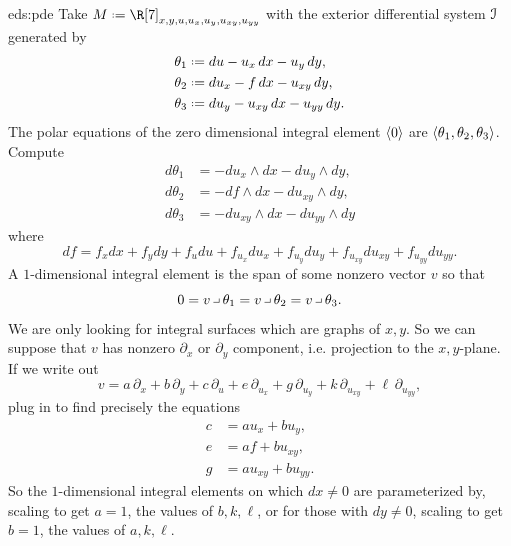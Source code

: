\begin{answer}{eds:pde}
Take \(M\defeq\R[7]_{x,y,u,u_x,u_y,u_{xy},u_{yy}}\) with the exterior differential system \(\mathcal{I}\) generated by
\begin{align*}
\theta_1&\defeq du-u_x\,dx-u_y\,dy,\\
\theta_2&\defeq du_x-f\,dx-u_{xy}\,dy,\\
\theta_3&\defeq du_y-u_{xy}\,dx-u_{yy}\,dy.
\end{align*}
The polar equations of the zero dimensional integral element \(\left<0\right>\) are \(\left<\theta_1,\theta_2,\theta_3\right>\).
Compute
\begin{align*}
d\theta_1&=-du_x\wedge dx-du_y\wedge dy,\\
d\theta_2&=-df\wedge dx-du_{xy}\wedge dy,\\
d\theta_3&=-du_{xy}\wedge dx-du_{yy}\wedge dy
\end{align*}
where
\[
df=f_x dx + f_y dy+f_u du+f_{u_x}du_x+f_{u_y}du_y+f_{u_{xy}}du_{xy}+f_{u_{yy}}du_{yy}.
\]
A \(1\)-dimensional integral element is the span of some nonzero vector \(v\) so that 
\[
0=v\hook\theta_1=v\hook\theta_2=v\hook\theta_3.
\]
We are only looking for integral surfaces which are graphs of \(x,y\).
So we can suppose that \(v\) has nonzero \(\partial_x\) or \(\partial_y\) component, i.e. projection to the \(x,y\)-plane.
If we write out 
\[
v=a \, \partial_x + b\, \partial_y + c\, \partial_u + e \, \partial_{u_x} + g \, \partial_{u_y} + k\, \partial_{u_{xy}} + \ell\, \partial_{u_{yy}},
\]
plug in to find precisely the equations
\begin{align*}
c&=au_x+bu_y,\\
e&=af+bu_{xy},\\
g&=au_{xy}+bu_{yy}.
\end{align*}
So the \(1\)-dimensional integral elements on which \(dx\ne 0\) are parameterized by, scaling to get \(a=1\), the values of \(b,k,\ell\), or for those with \(dy\ne 0\), scaling to get \(b=1\), the values of \(a,k,\ell\).


\end{answer}

